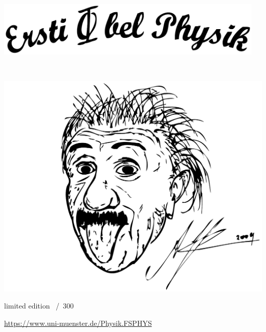 \begin{titlepage}
	\begin{center}
		\vspace*{-1.25cm}
		{\LARGE
		\fibeltitel\par}

		\vspace{0.5cm}
		\includegraphics[width=0.96\textwidth]{res/cover_schriftzug.pdf}

		{\huge
		\fibelsemester~\fibeljahr}

		\vspace{0.5cm}
		\includegraphics[width=\textwidth, height=0.53\textheight]{res/cover_einstein.pdf}
	\end{center}

	\LARGE
	limited edition \underline{\fontsize{32pt}{1em}}~/~300
	
	\vspace{1.9cm}
	\centering
	\url{https://www.uni-muenster.de/Physik.FSPHYS}
\end{titlepage}

